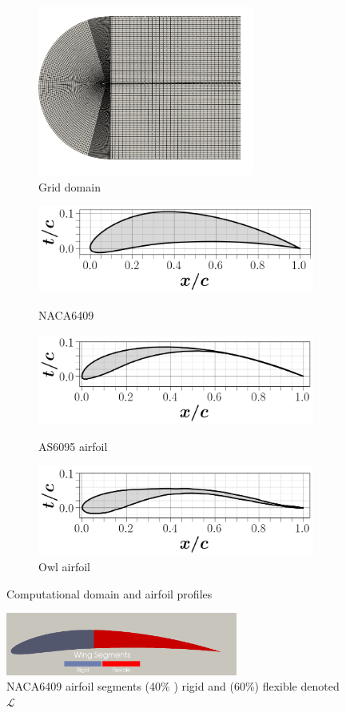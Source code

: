 \begin{figure}[hbt!]
  \centering
\begin{subfigure}{.4\textwidth}
   \includegraphics[width=2.8in]{Figures/mesh fluid.png}
  \caption{\label{fig:Griddomain} Grid domain}
\label{fig:airfoildesigna}
\end{subfigure}
\begin{subfigure}{.4\textwidth}
\includegraphics[width=.6\columnwidth]{Figures/naca_airfoil.png}
\caption{\label{fig:6409}NACA6409}
\includegraphics[width=.6\columnwidth]{Figures/AS9065_airfoil.png}
\caption{\label{fig:AS6095}AS6095 airfoil \cite{Ananda2018}}
\includegraphics[width=.6\columnwidth]{Figures/owl_airfoil.png}
\caption{\label{fig:owl}Owl airfoil \cite{Liu2004}}
\end{subfigure}
\caption{\label{fig:Ggeometry} Computational domain and airfoil profiles}
\end{figure}

\begin{figure}[hbt!]
  \centering
   \includegraphics[width=3in]{Figures/airfoilgeometry.png}
  \caption{\label{fig:airfoilSegments} NACA6409 airfoil segments (40\% ) rigid and (60\%) flexible denoted $\mathcal{L}$}
\end{figure}


